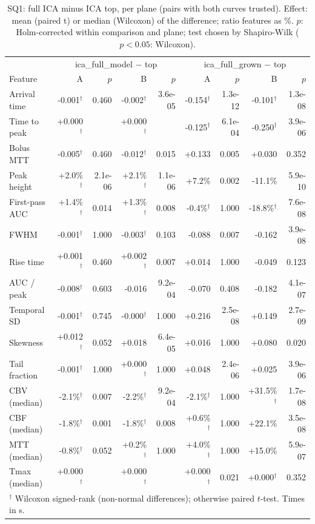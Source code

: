 \begin{table}[t]
\centering
\caption{SQ1: full ICA minus ICA top, per plane (pairs with both curves trusted). Effect: mean (paired t) or median (Wilcoxon) of the difference; ratio features as \%. $p$: Holm-corrected within comparison and plane; test chosen by Shapiro-Wilk ($p<0.05$: Wilcoxon).}
\label{tab:sq1}
\footnotesize
\begin{tabular}{lrrrrrrrr}
\hline
 & \multicolumn{4}{c}{ica\_full\_model $-$ top} & \multicolumn{4}{c}{ica\_full\_grown $-$ top} \\
Feature & A & $p$ & B & $p$ & A & $p$ & B & $p$ \\
\hline
Arrival time & -0.001$^\dagger$ & 0.460 & -0.002$^\dagger$ & 3.6e-05 & -0.154$^\dagger$ & 1.3e-12 & -0.101$^\dagger$ & 1.3e-08 \\
Time to peak & +0.000$^\dagger$ &  & +0.000$^\dagger$ &  & -0.125$^\dagger$ & 6.1e-04 & -0.250$^\dagger$ & 3.9e-06 \\
Bolus MTT & -0.005$^\dagger$ & 0.460 & -0.012$^\dagger$ & 0.015 & +0.133 & 0.005 & +0.030 & 0.352 \\
Peak height & +2.0\%$^\dagger$ & 2.1e-06 & +2.1\%$^\dagger$ & 1.1e-06 & +7.2\% & 0.002 & -11.1\% & 5.9e-10 \\
First-pass AUC & +1.4\%$^\dagger$ & 0.014 & +1.3\%$^\dagger$ & 0.008 & -0.4\%$^\dagger$ & 1.000 & -18.8\%$^\dagger$ & 7.6e-08 \\
FWHM & -0.001$^\dagger$ & 1.000 & -0.003$^\dagger$ & 0.103 & -0.088 & 0.007 & -0.162 & 3.9e-08 \\
Rise time & +0.001$^\dagger$ & 0.460 & +0.002$^\dagger$ & 0.007 & +0.014 & 1.000 & -0.049 & 0.123 \\
AUC / peak & -0.008$^\dagger$ & 0.603 & -0.016 & 9.2e-04 & -0.070 & 0.408 & -0.182 & 4.1e-07 \\
Temporal SD & -0.001$^\dagger$ & 0.745 & -0.000$^\dagger$ & 1.000 & +0.216 & 2.5e-08 & +0.149 & 2.7e-09 \\
Skewness & +0.012$^\dagger$ & 0.052 & +0.018 & 6.4e-05 & +0.016 & 1.000 & +0.080 & 0.020 \\
Tail fraction & -0.001$^\dagger$ & 1.000 & +0.000$^\dagger$ & 1.000 & +0.048 & 2.4e-06 & +0.025 & 3.9e-06 \\
CBV (median) & -2.1\%$^\dagger$ & 0.007 & -2.2\%$^\dagger$ & 9.2e-04 & -2.1\%$^\dagger$ & 1.000 & +31.5\%$^\dagger$ & 1.7e-08 \\
CBF (median) & -1.8\%$^\dagger$ & 0.001 & -1.8\%$^\dagger$ & 0.008 & +0.6\%$^\dagger$ & 1.000 & +22.1\% & 3.5e-08 \\
MTT (median) & -0.8\%$^\dagger$ & 0.052 & +0.2\%$^\dagger$ & 1.000 & +4.0\%$^\dagger$ & 1.000 & +15.0\% & 5.9e-07 \\
Tmax (median) & +0.000$^\dagger$ &  & +0.000$^\dagger$ &  & +0.000$^\dagger$ & 0.021 & +0.000$^\dagger$ & 0.352 \\
\hline
\multicolumn{9}{l}{$^\dagger$ Wilcoxon signed-rank (non-normal differences); otherwise paired $t$-test. Times in s.} \\
\end{tabular}
\end{table}
